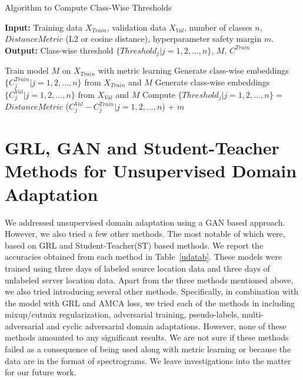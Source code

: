 \documentclass{article}
\begin{document}
\begin{algorithm}
    \caption{Algorithm to Compute Class-Wise Thresholds} 
    \hspace*{\algorithmicindent} \textbf{Input:} Training data $X_{Train}$, validation data $X_{Val}$, number of classes $n$, $DistanceMetric$ (L2 or cosine distance), hyperparameter safety margin $m$. \\
    \hspace*{\algorithmicindent} \textbf{Output:} Class-wise threshold $\{Threshold_j|j=1, 2, ..., n\}$, $M$, $C^{Train}$ \\

    \begin{algorithmic}[1]
        \State Train model $M$ on $X_{Train}$ with metric learning 
        \State Generate class-wise embeddings $\{C_j^{Train}|j=1, 2, ..., n\}$ from $X_{Train}$ and $M$
        \State Generate class-wise embeddings $\{C_j^{Val}|j=1, 2, ..., n\}$ from $X_{Val}$ and $M$
        \State Compute $\{Threshold_j|j=1, 2, ..., n\}$ = $DistanceMetric$ ($C_j^{Val}-C_j^{Train}|j=1, 2, ..., n$) + $m$
    \end{algorithmic} 
    \label{thresh}
\end{algorithm}

\section{GRL, GAN and Student-Teacher Methods for Unsupervised Domain Adaptation}

We addressed unsupervised domain adaptation using a GAN based approach. However, we also tried a few other methods. The most notable of which were, based on GRL and Student-Teacher(ST) based methods. We report the accuracies obtained from each method in Table~\ref{udatab}. These models were trained using three days of labeled source location data and three days of unlabeled server location data. Apart from the three methods mentioned above, we also tried introducing several other methods. Specifically, in combination with the model with GRL and AMCA loss, we tried each of the methods in \cite{zhang2017mixup, yun2019cutmix, goodfellow2014explaining, lee2013pseudo, pei2018multi, hosseini2018augmented} including mixup/cutmix regularization, adversarial training, pseudo-labels, multi-adversarial and cyclic adversarial domain adaptations. However, none of these methods amounted to any significant results. We are not sure if these methods failed as a consequence of being used along with metric learning or because the data are in the format of spectrograms. We leave investigations into the matter for our future work.  
\end{document}
